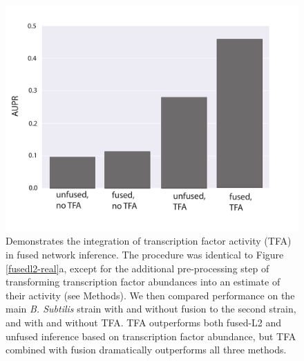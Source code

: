 \documentclass[11pt]{article}
\begin{document}
\pagebreak
\begin{figure}
\begin{center}
  \includegraphics[scale=0.30]{fig7.pdf}
  \caption{\label{tfa} Demonstrates the integration of transcription factor activity (TFA) in fused network inference. The procedure was identical to Figure \ref{fusedl2-real}a, except for the additional pre-processing step of transforming transcription factor abundances into an estimate of their activity (see Methods). We then compared performance on the main \textit{B. Subtilis} strain with and without fusion to the second strain, and with and without TFA. TFA outperforms both fused-L2 and unfused inference based on transcription factor abundance, but TFA combined with fusion dramatically outperforms all three methods.}
\end{center}
\end{figure}
\end{document}
